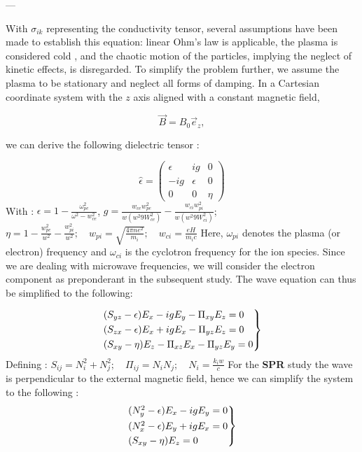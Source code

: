 \documentclass[11pt,a4paper,openany]{report}
\begin{document}
\begin{multicols}{2}
    ---

    With $\sigma_{ik}$ representing the conductivity tensor, several assumptions have been made to establish this equation: linear Ohm's law is applicable, the plasma is considered cold \cite{cite}, and the chaotic motion of the particles, implying the neglect of kinetic effects, is disregarded. To simplify the problem further, we assume the plasma to be stationary and neglect all forms of damping. In a Cartesian coordinate system with the $z$ axis aligned with a constant magnetic field,

    $$\vec{B} = B_0 \vec{e}_z,$$

    we can derive the following dielectric tensor \cite{Thomas H. Stix}:

    $$
        \hat{\epsilon} = \begin{pmatrix}
            \epsilon & ig       & 0    \\
            -ig      & \epsilon & 0    \\
            0        & 0        & \eta
        \end{pmatrix}
    $$
    With : $\epsilon = 1 - \frac{\omega_{pe}^2}{\omega^2 - w_{ce}^2}$, $g = \frac{w_{ce}w_{pe}^2}{w(w^2 9 W_{ce}^2)} - \frac{w_{ci}w_{pi}^2}{w(w^2 9 W_{ci}^2)}$;
    $ \eta  = 1 - \frac{w_{pe}^2}{w^2} -  \frac{w_{pi}^2}{w^2}; \quad w_{pi} = \sqrt{\frac{4\pi n e^2}{m_i}}; \quad w_{ci} = \frac{eH}{m_i c}$
    Here, $\omega_{pi}$ denotes the plasma (or electron) frequency and $\omega_{ci}$ is the cyclotron frequency for the ion species. Since we are dealing with microwave frequencies, we will consider the electron component as preponderant in the subsequent study. The wave equation can thus be simplified to the following:

    \begin{equation}
        \begin{rcases}
            (S_{yz} - \epsilon)E_x - igE_y - \Pi_{xy}E_z = 0 \\
            (S_{zx} - \epsilon)E_x + igE_x - \Pi_{yz}E_z = 0 \\
            (S_{xy} - \eta)E_z -\Pi_{xz}E_x - \Pi_{yz}E_y = 0
        \end{rcases}
    \end{equation}
    Defining : $S_{ij} = N_i^2 + N_j^2; \quad \Pi_{ij} = N_iN_j ; \quad N_{i} = \frac{k_iw}{c}$
    For the \textbf{SPR} study the wave is perpendicular to the external magnetic field, hence we can simplify the system to the following :
    \begin{equation}
        \begin{rcases}
            (N_y^2 - \epsilon)E_x - igE_y = 0 \\
            (N_x^2 - \epsilon)E_y + igE_x = 0 \\
            (S_{xy} - \eta)E_z = 0
        \end{rcases}
    \end{equation}


\end{multicols}
\end{document}
